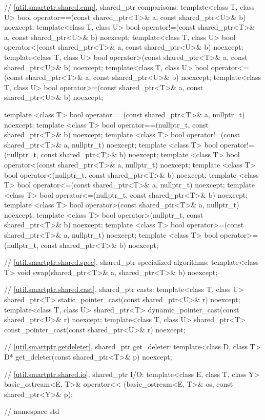 \begin{codeblock}
{  // \ref{util.smartptr.shared.cmp}, shared_ptr comparisons:
  template<class T, class U>
    bool operator==(const shared_ptr<T>& a, const shared_ptr<U>& b) noexcept;
  template<class T, class U>
    bool operator!=(const shared_ptr<T>& a, const shared_ptr<U>& b) noexcept;
  template<class T, class U>
    bool operator<(const shared_ptr<T>& a, const shared_ptr<U>& b) noexcept;
  template<class T, class U>
    bool operator>(const shared_ptr<T>& a, const shared_ptr<U>& b) noexcept;
  template<class T, class U>
    bool operator<=(const shared_ptr<T>& a, const shared_ptr<U>& b) noexcept;
  template<class T, class U>
    bool operator>=(const shared_ptr<T>& a, const shared_ptr<U>& b) noexcept;

  template <class T>
    bool operator==(const shared_ptr<T>& a, nullptr_t) noexcept;
  template <class T>
    bool operator==(nullptr_t, const shared_ptr<T>& b) noexcept;
  template <class T>
    bool operator!=(const shared_ptr<T>& a, nullptr_t) noexcept;
  template <class T>
    bool operator!=(nullptr_t, const shared_ptr<T>& b) noexcept;
  template <class T>
    bool operator<(const shared_ptr<T>& a, nullptr_t) noexcept;
  template <class T>
    bool operator<(nullptr_t, const shared_ptr<T>& b) noexcept;
  template <class T>
    bool operator<=(const shared_ptr<T>& a, nullptr_t) noexcept;
  template <class T>
    bool operator<=(nullptr_t, const shared_ptr<T>& b) noexcept;
  template <class T>
    bool operator>(const shared_ptr<T>& a, nullptr_t) noexcept;
  template <class T>
    bool operator>(nullptr_t, const shared_ptr<T>& b) noexcept;
  template <class T>
    bool operator>=(const shared_ptr<T>& a, nullptr_t) noexcept;
  template <class T>
    bool operator>=(nullptr_t, const shared_ptr<T>& b) noexcept;

  // \ref{util.smartptr.shared.spec}, shared_ptr specialized algorithms:
  template<class T> void swap(shared_ptr<T>& a, shared_ptr<T>& b) noexcept;

  // \ref{util.smartptr.shared.cast}, shared_ptr casts:
  template<class T, class U>
    shared_ptr<T> static_pointer_cast(const shared_ptr<U>& r) noexcept;
  template<class T, class U>
    shared_ptr<T> dynamic_pointer_cast(const shared_ptr<U>& r) noexcept;
  template<class T, class U>
    shared_ptr<T> const_pointer_cast(const shared_ptr<U>& r) noexcept;

  // \ref{util.smartptr.getdeleter}, shared_ptr get_deleter:
  template<class D, class T> D* get_deleter(const shared_ptr<T>& p) noexcept;

  // \ref{util.smartptr.shared.io}, shared_ptr I/O:
  template<class E, class T, class Y>
    basic_ostream<E, T>& operator<< (basic_ostream<E, T>& os, const shared_ptr<Y>& p);
} // namespace std
\end{codeblock}

